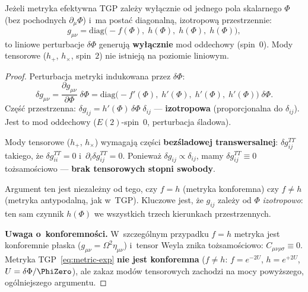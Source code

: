 \begin{theorem}%
\label{thm:no-tensor}
Je\.zeli metryka efektywna TGP zale\.zy wy\l{}\k{a}cznie
od jednego pola skalarnego $\Phi$ (bez pochodnych $\partial_\mu\Phi$)
i~ma posta\'c diagonaln\k{a}, izotropow\k{a} przestrzennie:
\begin{equation}\label{eq:metric-one-scalar}
  g_{\mu\nu} = \mathrm{diag}\bigl(-f(\Phi),\;h(\Phi),\;h(\Phi),\;h(\Phi)\bigr),
\end{equation}
to liniowe perturbacje $\delta\Phi$ generuj\k{a}
\textbf{wy\l{}\k{a}cznie} mod oddechowy (spin~$0$).
Mody tensorowe ($h_+$, $h_\times$, spin~$2$) nie istniej\k{a}
na poziomie liniowym.
\end{theorem}

\begin{proof}
Perturbacja metryki indukowana przez $\delta\Phi$:
\begin{equation}
  \delta g_{\mu\nu}
  = \frac{\partial g_{\mu\nu}}{\partial\Phi}\;\delta\Phi
  = \mathrm{diag}\bigl(-f'(\Phi),\;h'(\Phi),\;h'(\Phi),\;h'(\Phi)\bigr)
    \;\delta\Phi.
\end{equation}
Cz\k{e}\'s\'c przestrzenna:
$\delta g_{ij} = h'(\Phi)\,\delta\Phi\;\delta_{ij}$
--- \textbf{izotropowa} (proporcjonalna do $\delta_{ij}$).
Jest to mod oddechowy ($E(2)$-spin~$0$, perturbacja \'sladowa).

Mody tensorowe ($h_+$, $h_\times$) wymagaj\k{a} cz\k{e}\'sci
\textbf{bez\'sladowej transwersalnej}: $\delta g_{ij}^{TT}$ takiego,
\.ze $\delta g_{ii}^{TT} = 0$ i~$\partial_i \delta g_{ij}^{TT} = 0$.
Poniewa\.z $\delta g_{ij} \propto \delta_{ij}$, mamy
$\delta g_{ij}^{TT} \equiv 0$ to\.zsamo\'sciowo ---
\textbf{brak tensorowych stopni swobody}.

Argument ten jest niezale\.zny od tego, czy $f = h$
(metryka konforemna) czy $f \neq h$ (metryka
antypodaln\k{a}, jak w~TGP). Kluczowe jest, \.ze
$g_{ij}$ zale\.zy od $\Phi$ \emph{izotropowo}: ten sam
czynnik $h(\Phi)$ we wszystkich trzech kierunkach
przestrzennych.

\smallskip\noindent\textbf{Uwaga o~konforemno\'sci.}
W~szczeg\'olnym przypadku $f = h$ metryka jest konforemnie
p\l{}aska ($g_{\mu\nu} = \Omega^2\eta_{\mu\nu}$) i~tensor
Weyla znika to\.zsamo\'sciowo: $C_{\mu\nu\rho\sigma} \equiv 0$.
Metryka TGP~\eqref{eq:metric-exp} \textbf{nie jest konforemna}
($f \neq h$: $f = e^{-2U}$, $h = e^{+2U}$, $U = \delta\Phi/\PhiZero$),
ale zakaz mod\'ow tensorowych zachodzi na mocy powy\.zszego,
og\'olniejszego argumentu.
\end{proof}

